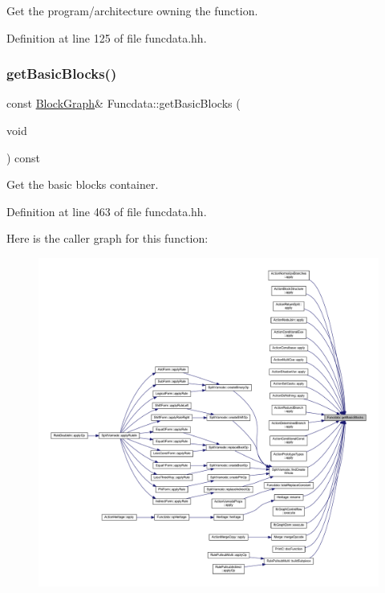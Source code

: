 Get the program/architecture owning the function. 



Definition at line 125 of file funcdata.\+hh.

\mbox{\label{class_funcdata_add21153afa5eb571406d1f64b8b344db}} 
\subsubsection{\texorpdfstring{getBasicBlocks()}{getBasicBlocks()}}
{\footnotesize\ttfamily const \mbox{\hyperlink{class_block_graph}{Block\+Graph}}\& Funcdata\+::get\+Basic\+Blocks (\begin{DoxyParamCaption}\item[{void}]{ }\end{DoxyParamCaption}) const\hspace{0.3cm}{\ttfamily [inline]}}



Get the basic blocks container. 



Definition at line 463 of file funcdata.\+hh.

Here is the caller graph for this function\+:
\nopagebreak
\begin{figure}[H]
\begin{center}
\leavevmode
\includegraphics[width=350pt]{class_funcdata_add21153afa5eb571406d1f64b8b344db_icgraph}
\end{center}
\end{figure}
\mbox{\label{class_funcdata_a8bc1d922d37c04236c4f7db44930b4fc}} 

